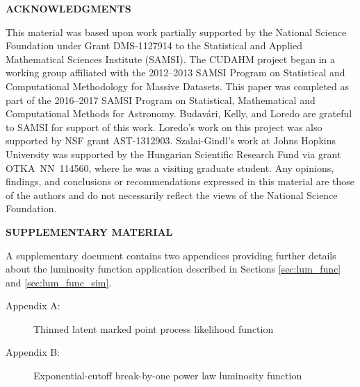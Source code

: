 \documentclass[12pt]{article}
\numberwithin{equation}{section}
\numberwithin{figure}{section}
\numberwithin{table}{section}
\begin{document}

%





\begin{center}
{\large\bf ACKNOWLEDGMENTS}
\end{center}

This material was based upon work partially supported by the National Science Foundation under Grant DMS-1127914 to the Statistical and Applied Mathematical Sciences Institute (SAMSI). 
The CUDAHM project began in a working group affiliated with the 2012--2013 SAMSI Program on Statistical and Computational Methodology for Massive Datasets.
This paper was completed as part of the 2016--2017 SAMSI Program on Statistical, Mathematical and Computational Methods for Astronomy.
Budav\'ari, Kelly, and Loredo are grateful to SAMSI for support of this work.
Loredo's work on this project was also supported by NSF grant AST-1312903.
Szalai-Gindl's work at Johns Hopkins University was supported by the Hungarian Scientific Research Fund via grant OTKA~NN~114560, where he was a visiting graduate student.
Any opinions, findings, and conclusions or recommendations expressed in this material are those of the authors and do not necessarily reflect the views of the National Science Foundation.


\begin{center}
{\large\bf SUPPLEMENTARY MATERIAL}
\end{center}

A supplementary document contains two appendices providing further details about the luminosity function application described in Sections \ref{sec:lum_func} and \ref{sec:lum_func_sim}.
\begin{description}
\item[Appendix A:] Thinned latent marked point process likelihood function
\item[Appendix B:] Exponential-cutoff break-by-one power law luminosity function
\end{description}





\end{document}
